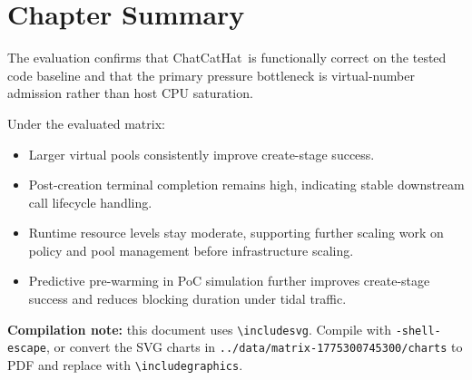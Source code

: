 \documentclass[12pt,a4paper]{report}
\newcommand{\MatrixChartsDir}{../data/matrix-1775300745300/charts}
\begin{document}
\section{Chapter Summary}
\label{sec:chapter-summary}
The evaluation confirms that ChatCatHat\texttrademark\ is functionally correct on the tested code baseline and that the primary pressure bottleneck is virtual-number admission rather than host CPU saturation.

Under the evaluated matrix:
\begin{itemize}
  \item Larger virtual pools consistently improve create-stage success.
  \item Post-creation terminal completion remains high, indicating stable downstream call lifecycle handling.
  \item Runtime resource levels stay moderate, supporting further scaling work on policy and pool management before infrastructure scaling.
  \item Predictive pre-warming in PoC simulation further improves create-stage success and reduces blocking duration under tidal traffic.
\end{itemize}

\vspace{0.5em}
\noindent
\textbf{Compilation note:} this document uses \texttt{\textbackslash includesvg}. Compile with \texttt{-shell-escape}, or convert the SVG charts in \texttt{\MatrixChartsDir} to PDF and replace with \texttt{\textbackslash includegraphics}.
\end{document}
